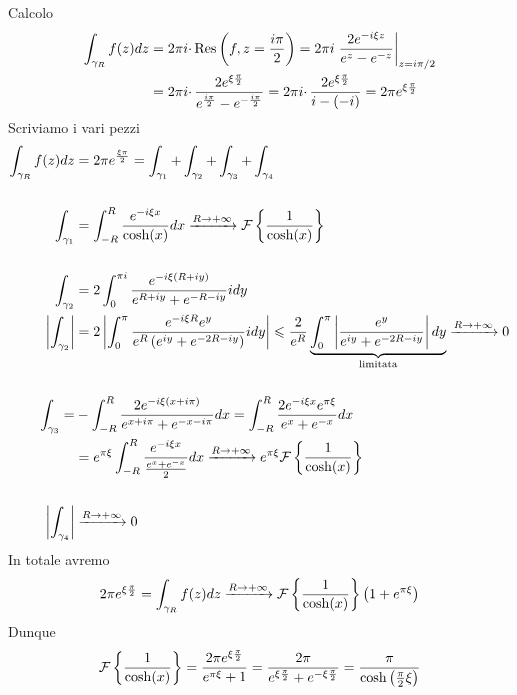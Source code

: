 Calcolo
\begin{equation*}
\begin{aligned}
\int _{\gamma _{R}} f(z)dz & =2\pi i\cdotp \operatorname{Res} \left( f,z=\frac{i\pi }{2}\right) =2\pi i\left. \frac{2e^{-i\xi z}}{e^{z} -e^{-z}}\right| _{z=i\pi /2}\\
 & =2\pi i\cdotp \frac{2e^{\xi \frac{\pi }{2}}}{e^{\frac{i\pi }{2}} -e^{-\frac{i\pi }{2}}} =2\pi i\cdotp \frac{2e^{\xi \frac{\pi }{2}}}{i-( -i)} =2\pi e^{\xi \frac{\pi }{2}}
\end{aligned}
\end{equation*}
Scriviamo i vari pezzi
\begin{align*}
\int _{\gamma _{R}} f( z) dz & =2\pi e^{\frac{\xi \pi }{2}} =\int _{\gamma _{1}} +\int _{\gamma _{2}} +\int _{\gamma _{3}} +\int _{\gamma _{4}}\\
 & \\
\int _{\gamma _{1}} & =\int ^{R}_{-R}\frac{e^{-i\xi x}}{\cosh (x)} dx\xrightarrow{R\rightarrow +\infty }\mathcal{F} \left\{\frac{1}{\cosh (x)}\right\}\\
 & \\
\int _{\gamma _{2}} & =2\int ^{\pi i}_{0}\frac{e^{-i\xi (R+iy)}}{e^{R+iy} +e^{-R-iy}} idy\\
\left| \int _{\gamma _{2}}\right|  & =2\left| \int ^{\pi }_{0}\frac{e^{-i\xi R} e^{y}}{e^{R}\left( e^{iy} +e^{-2R-iy}\right)} idy\right| \leqslant \frac{2}{e^{R}}\underbrace{\int ^{\pi }_{0}\left| \frac{e^{y}}{e^{iy} +e^{-2R-iy}}\right| dy}_{\text{limitata}}\xrightarrow{R\rightarrow +\infty } 0\\
 & \\
\int _{\gamma _{3}} = & -\int ^{R}_{-R}\frac{2e^{-i\xi ( x+i\pi )}}{e^{x+i\pi } +e^{-x-i\pi }} dx=\int ^{R}_{-R}\frac{2e^{-i\xi x} e^{\pi \xi }}{e^{x} +e^{-x}} dx\\
 & =e^{\pi \xi }\int ^{R}_{-R}\frac{e^{-i\xi x}}{\frac{e^{x} +e^{-x}}{2}} dx\xrightarrow{R\rightarrow +\infty } e^{\pi \xi }\mathcal{F} \left\{\frac{1}{\cosh (x)}\right\}\\
 & \\
\left| \int _{\gamma _{4}}\right|  & \xrightarrow{R\rightarrow +\infty } 0
\end{align*}
In totale avremo
\begin{equation*}
2\pi e^{\xi \frac{\pi }{2}} =\int _{\gamma _{R}} f( z) dz\xrightarrow{R\rightarrow +\infty }\mathcal{F} \left\{\frac{1}{\cosh (x)}\right\}\left( 1+e^{\pi \xi }\right)
\end{equation*}
Dunque
\begin{equation*}
\mathcal{F} \left\{\frac{1}{\cosh (x)}\right\} =\frac{2\pi e^{\xi \frac{\pi }{2}}}{e^{\pi \xi } +1} =\frac{2\pi }{e^{\xi \frac{\pi }{2}} +e^{-\xi \frac{\pi }{2}}} =\frac{\pi }{\cosh\left(\frac{\pi }{2} \xi \right)}
\end{equation*}
\Soluzione

